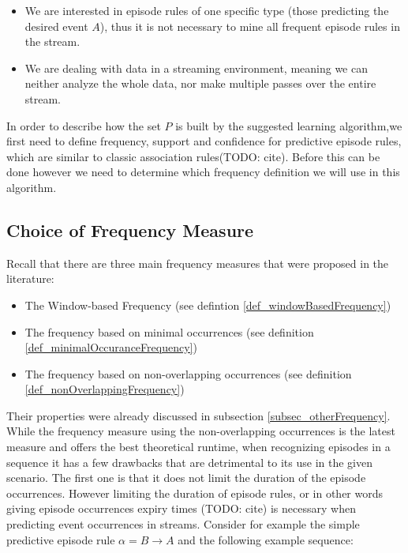 \begin{itemize}
 \item We are interested in episode rules of one specific type (those predicting the desired event $A$), thus it is not necessary to mine all frequent episode rules in the stream.
 \item We are dealing with data in a streaming environment, meaning we can neither analyze the whole data, nor make multiple passes over the entire stream.
\end{itemize}

In order to describe how the set $P$ is built by the suggested learning algorithm,we first need to define frequency, support and confidence for predictive episode rules, which are similar to classic association rules(TODO: cite). Before this can be done however we need to determine which frequency definition we will use in this algorithm. 

\subsection{Choice of Frequency Measure}

Recall that there are three main frequency measures that were proposed in the literature:

\begin{itemize}
	\item The Window-based Frequency (see defintion \ref{def_windowBasedFrequency})
	\item The frequency based on minimal occurrences (see definition \ref{def_minimalOccuranceFrequency})
	\item The frequency based on non-overlapping occurrences (see definition \ref{def_nonOverlappingFrequency})
\end{itemize}

Their properties were already discussed in subsection \ref{subsec_otherFrequency}. While the frequency measure using the non-overlapping occurrences is the latest measure and offers the best theoretical runtime, when recognizing episodes in a sequence it has a few drawbacks that are detrimental to its use in the given scenario. The first one is that it does not limit the duration of the episode occurrences. However limiting the duration of episode rules, or in other words giving episode occurrences expiry times (TODO: cite) is necessary when predicting event occurrences in streams. Consider for example the simple predictive episode rule $\alpha = B \rightarrow A$ and the following example sequence: 

